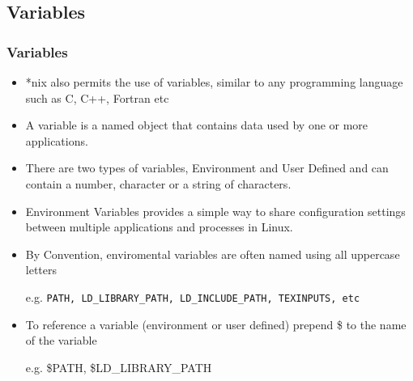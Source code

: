 \documentclass[slidestop,mathserif,compress,xcolor=svgnames]{beamer}
\newcommand*\vardiamond{\textcolor{tigerspurple}{%
  \ensuremath{\blacklozenge}}}
\begin{document}
\subsection{Variables}
\begin{frame}
  \frametitle{\small Variables}
  \begin{itemize}
    \item *nix also permits the use of variables, similar to any programming language such as C, C++, Fortran etc
    \item A variable is a named object that contains data used by one or more applications. 
    \item There are two types of variables, Environment and User Defined and can contain  a number, character or a string of characters.
    \item Environment Variables provides a simple way to share configuration settings between multiple applications and processes in Linux.
    \item By Convention, enviromental variables are often named using all uppercase letters
    \item[e.g.] \texttt{PATH, LD\_LIBRARY\_PATH, LD\_INCLUDE\_PATH, TEXINPUTS, etc}
    \item To reference a variable (environment or user defined) prepend \$ to the name of the variable
    \item[e.g.] \$PATH, \$LD\_LIBRARY\_PATH
  \end{itemize}

\end{frame}
\end{document}
